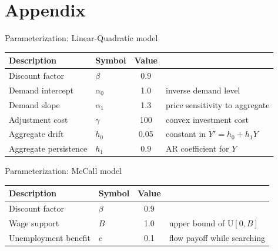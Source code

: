 \documentclass[aspectratio=169,10pt]{beamer}
\begin{document}
\section{Appendix}


\begin{frame}[label=lq-param]{Parameterization: Linear-Quadratic model}
	\vspace{0.2in}
	\begin{center}
		\begin{tabular}{llcl}
			\toprule
			Description & Symbol & Value & \\
			\midrule
			Discount factor       & $\beta$    & \textcolor{emphcolorval}{0.9}  & \\
			Demand intercept      & $\alpha_0$ & \textcolor{emphcolorval}{1.0}  & inverse demand level \\
			Demand slope          & $\alpha_1$ & \textcolor{emphcolorval}{1.3}  & price sensitivity to aggregate \\
			Adjustment cost       & $\gamma$   & \textcolor{emphcolorval}{100}  & convex investment cost \\
			Aggregate drift       & $h_0$      & \textcolor{emphcolorval}{0.05} & constant in $Y' = h_0 + h_1 Y$ \\
			Aggregate persistence & $h_1$      & \textcolor{emphcolorval}{0.9}  & AR coefficient for $Y$ \\
			\bottomrule
		\end{tabular}
	\end{center}
	\vspace{0.1in}
	\hfill\hyperlink{lq-nn-impl}{}
\end{frame}

\begin{frame}[label=mccall-param]{Parameterization: McCall model}
	\vspace{0.2in}
	\begin{center}
		\begin{tabular}{llcl}
			\toprule
			Description & Symbol & Value & \\
			\midrule
			Discount factor      & $\beta$ & \textcolor{emphcolorval}{0.9} & \\
			Wage support         & $B$     & \textcolor{emphcolorval}{1.0} & upper bound of $\mathrm{U}[0,B]$ \\
			Unemployment benefit & $c$     & \textcolor{emphcolorval}{0.1} & flow payoff while searching \\
			\bottomrule
		\end{tabular}
	\end{center}
	\vspace{0.1in}
	\hfill\hyperlink{mccall-impl}{}
\end{frame}
\end{document}
